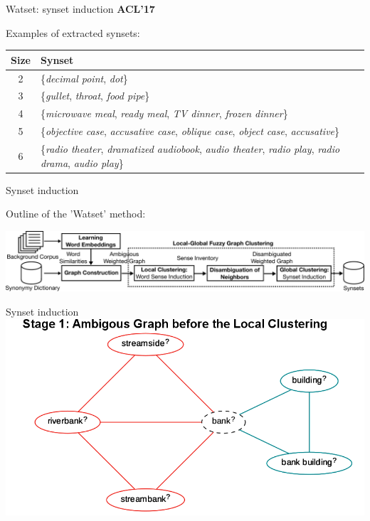 

\begin{frame}{Watset: synset induction}
	\textbf{ACL'17}~\cite{ustalov-panchenko-biemann:2017:Long}
	
	
\vspace{1em}
Examples of extracted synsets:
\vspace{1em}
\centering
\begin{tabular}{c|p{9cm}}
\textbf{Size} & \textbf{Synset}\\\hline
2 & \{\textit{decimal point}, \textit{dot}\}\\
3 & \{\textit{gullet}, \textit{throat}, \textit{food pipe}\}\\
4 & \{\textit{microwave meal}, \textit{ready meal}, \textit{TV dinner}, \textit{frozen dinner}\}\\
5 & \{\textit{objective case}, \textit{accusative case}, \textit{oblique case}, \textit{object case}, \textit{accusative}\}\\
6 & \{\textit{radio theater}, \textit{dramatized audiobook}, \textit{audio theater}, \textit{radio play}, \textit{radio drama}, \textit{audio play}\}\\
\end{tabular}


	
	
\end{frame}


\begin{frame}{Synset induction}
	
	
Outline of the 'Watset' method:

\vspace{2em}

\centering\includegraphics[width=1.05\textwidth]{outline}
	
\end{frame}


\begin{frame}{Synset induction}
\centering\includegraphics[width=1\textwidth]{stages1}	
\end{frame}



